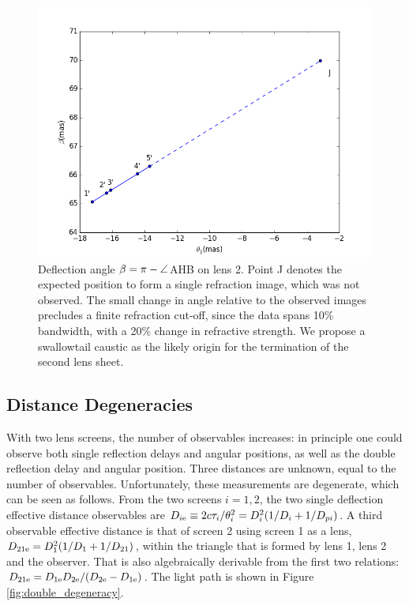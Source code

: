 \documentclass[useAMS,usenatbib]{mn2e}
\begin{document}
\begin{figure}
\centering
\includegraphics[width=1.0\linewidth]{Reflection_angle.png}
\caption{Deflection angle $\beta=\pi-\protect\angle$AHB on lens 2.  Point J denotes the expected position to form a single refraction image, which was not
  observed.   The small change in angle relative to the observed
  images precludes a finite refraction cut-off, since the data spans
  10\% bandwidth, with a 20\% change in refractive strength.  We
  propose a swallowtail caustic as the likely origin for the
  termination of the second lens sheet.
}
\label{vtrans}
\end{figure}

\subsection{Distance Degeneracies}
\label{sec:degeneracy}
With two lens screens, the number of observables increases: in
principle one could observe both single reflection delays and angular
positions, as well as the double reflection delay and angular
position.  Three distances are unknown, equal to the number of
observables.  Unfortunately, these measurements are degenerate, which
can be seen as follows. From the two screens $i=1,2$, the two single
deflection effective distance observables are
$D_{i{\rm e}} \equiv 2c\tau_i/\theta_i^2=D_i^2(1/D_i+1/D_{pi})$.  A third
observable effective distance is that of screen 2 using screen 1 as a
lens, $D_{21{\rm e}}=D_1^2(1/D_1+1/D_{21})$, within the triangle that is formed by lens 1, lens 2 and the observer. That is also algebraically
derivable from the first two relations:
$D_{{21}{\rm e}}=D_{1{\rm e}}D_{2{\rm e}}/(D_{2{\rm e}}-D_{1{\rm e}})$. The light path is shown in Figure \ref{fig:double_degeneracy}.
\end{document}
